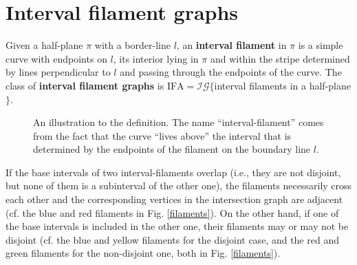 \chapter{Interval filament graphs}

\begin{defn}
	Given a half-plane $\pi$ with a border-line $l$, an \textbf{interval filament} in $\pi$ is a simple curve with endpoints on $l$, its interior lying in $\pi$ and within the stripe determined by lines perpendicular to $l$ and passing through the endpoints of the curve. The class of \textbf{interval filament graphs} is $\text{IFA} = \mathcal{IG}\{$interval filaments in a half-plane$\}$.
\end{defn}

\begin{figure}[!ht]\centering
	\caption{An illustration to the definition. The name “interval-filament” comes from the fact that the curve “lives above” the interval that is determined by the endpoints of the filament on the boundary line $l$.}
\end{figure}

\begin{comm}
	If the base intervals of two interval-filaments overlap (i.e., they are not disjoint, but none of them is a subinterval of the other one), the filaments necessarily cross each other and the corresponding vertices in the intersection graph are adjacent (cf. the blue and red filaments in Fig. \ref{filaments}). On the other hand, if one of the base intervals is included in the other one, their filaments may or may not be disjoint (cf. the blue and yellow filaments for the disjoint case, and the red and green filaments for the non-disjoint one, both in Fig. \ref{filaments}).
\end{comm}

